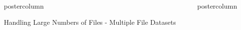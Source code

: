 \documentclass[final,poster]{beamer}
\newlength{\columnheight}
\begin{document}
\begin{frame}
\begin{columns}
\begin{column}{.67\textwidth}
\begin{beamercolorbox}[center,wd=\textwidth]{postercolumn}
\begin{minipage}[T]{.98\textwidth}
{\begin{block}{Handling Large Numbers of Files - Multiple File Datasets}
                \begin{columns}
                  \begin{column}{.24\textwidth}
                    \workflowlimitfigs
                  \end{column}
                  \begin{column}{.35\textwidth}
                    \multiplefiledatasetsdesc
                  \end{column}
                  \begin{column}{.39\textwidth}
                    \openmsfig
                  \end{column}
                \end{columns}
              \end{block}
            }
          \end{minipage}
        \end{beamercolorbox}
      \end{column}              

      \begin{column}{.33\textwidth}
        \begin{beamercolorbox}[center,wd=\textwidth]{postercolumn}
          \begin{minipage}[T]{.98\textwidth} %
            \parbox[t][\columnheight]{\textwidth}{
              \windowschallangesblock
              \vfill
              \lwrblock
              \vfill
              \msconvertblock
              \vfill
              \maxquantblock
              \vfill
              \proteinpilotblock
            }
          \end{minipage}
        \end{beamercolorbox}
      \end{column}              
    \end{columns}   
  \end{frame}
\end{document}
